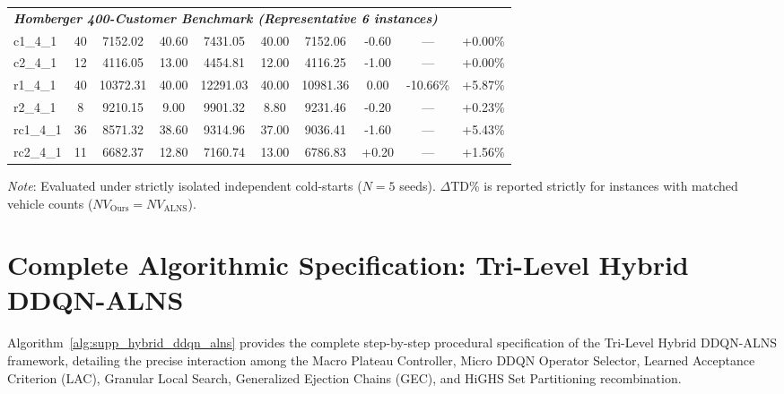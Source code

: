 \documentclass{article}
\begin{document}
\begin{table}[!htbp]
\begin{tabular*}{\textwidth}{@{\extracolsep{\fill}} l cc cc cc ccc @{}}
\midrule
\multicolumn{10}{l}{\textit{\textbf{Homberger 400-Customer Benchmark (Representative 6 instances)}}} \\
c1\_4\_1 & 40 & 7152.02 & 40.60 & 7431.05 & 40.00 & 7152.06 & -0.60 & --- & +0.00\% \\
c2\_4\_1 & 12 & 4116.05 & 13.00 & 4454.81 & 12.00 & 4116.25 & -1.00 & --- & +0.00\% \\
r1\_4\_1 & 40 & 10372.31 & 40.00 & 12291.03 & 40.00 & 10981.36 & 0.00 & -10.66\% & +5.87\% \\
r2\_4\_1 & 8 & 9210.15 & 9.00 & 9901.32 & 8.80 & 9231.46 & -0.20 & --- & +0.23\% \\
rc1\_4\_1 & 36 & 8571.32 & 38.60 & 9314.96 & 37.00 & 9036.41 & -1.60 & --- & +5.43\% \\
rc2\_4\_1 & 11 & 6682.37 & 12.80 & 7160.74 & 13.00 & 6786.83 & +0.20 & --- & +1.56\% \\
\bottomrule
\end{tabular*}
{\raggedright \scriptsize \textit{Note}: Evaluated under strictly isolated independent cold-starts ($N=5$ seeds). $\Delta$TD\% is reported strictly for instances with matched vehicle counts ($NV_{\text{Ours}} = NV_{\text{ALNS}}$).\par}
\end{table}

\section{Complete Algorithmic Specification: Tri-Level Hybrid DDQN-ALNS}
\label{sec:supp_full_algorithm}

Algorithm~\ref{alg:supp_hybrid_ddqn_alns} provides the complete step-by-step procedural specification of the Tri-Level Hybrid DDQN-ALNS framework, detailing the precise interaction among the Macro Plateau Controller, Micro DDQN Operator Selector, Learned Acceptance Criterion (LAC), Granular Local Search, Generalized Ejection Chains (GEC), and HiGHS Set Partitioning recombination.
\end{document}

